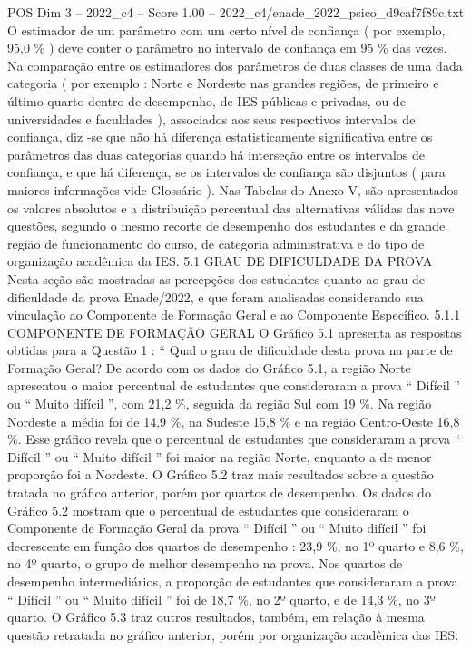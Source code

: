 \begin{textsample}{POS Dim 3 – 2022\_c4 – Score 1.00 – 2022\_c4/enade\_2022\_psico\_d9caf7f89c.txt}
O estimador de um parâmetro com um certo nível de confiança ( por exemplo, 95,0 \% ) deve conter o parâmetro no intervalo de confiança em 95 \% das vezes.
Na comparação entre os estimadores dos parâmetros de duas classes de uma dada categoria ( por exemplo : Norte e Nordeste nas grandes regiões, de primeiro e último quarto dentro de desempenho, de IES públicas e privadas, ou de universidades e faculdades ), associados aos seus respectivos intervalos de confiança, diz -se que não há diferença estatisticamente significativa entre os parâmetros das duas categorias quando há interseção entre os intervalos de confiança, e que há diferença, se os intervalos de confiança são disjuntos ( para maiores informações vide Glossário ).
Nas Tabelas do Anexo V, são apresentados os valores absolutos e a distribuição percentual das alternativas válidas das nove questões, segundo o mesmo recorte de desempenho dos estudantes e da grande região de funcionamento do curso, de categoria administrativa e do tipo de organização acadêmica da IES. 5.1 GRAU DE DIFICULDADE DA PROVA Nesta seção são mostradas as percepções dos estudantes quanto ao grau de dificuldade da prova Enade/2022, e que foram analisadas considerando sua vinculação ao Componente de Formação Geral e ao Componente Específico. 5.1.1 COMPONENTE DE FORMAÇÃO GERAL O Gráfico 5.1 apresenta as respostas obtidas para a Questão 1 : “ Qual o grau de dificuldade desta prova na parte de Formação Geral?
De acordo com os dados do Gráfico 5.1, a região Norte apresentou o maior percentual de estudantes que consideraram a prova “ Difícil ” ou “ Muito difícil ”, com 21,2 \%, seguida da região Sul com 19 \%.
Na região Nordeste a média foi de 14,9 \%, na Sudeste 15,8 \% e na região Centro-Oeste 16,8 \%.
Esse gráfico revela que o percentual de estudantes que consideraram a prova “ Difícil ” ou “ Muito difícil ” foi maior na região Norte, enquanto a de menor proporção foi a Nordeste.
O Gráfico 5.2 traz mais resultados sobre a questão tratada no gráfico anterior, porém por quartos de desempenho.
Os dados do Gráfico 5.2 mostram que o percentual de estudantes que consideraram o Componente de Formação Geral da prova “ Difícil ” ou “ Muito difícil ” foi decrescente em função dos quartos de desempenho : 23,9 \%, no 1º quarto e 8,6 \%, no 4º quarto, o grupo de melhor desempenho na prova.
Nos quartos de desempenho intermediários, a proporção de estudantes que consideraram a prova “ Difícil ” ou “ Muito difícil ” foi de 18,7 \%, no 2º quarto, e de 14,3 \%, no 3º quarto.
O Gráfico 5.3 traz outros resultados, também, em relação à mesma questão retratada no gráfico anterior, porém por organização acadêmica das IES.

\end{textsample}
